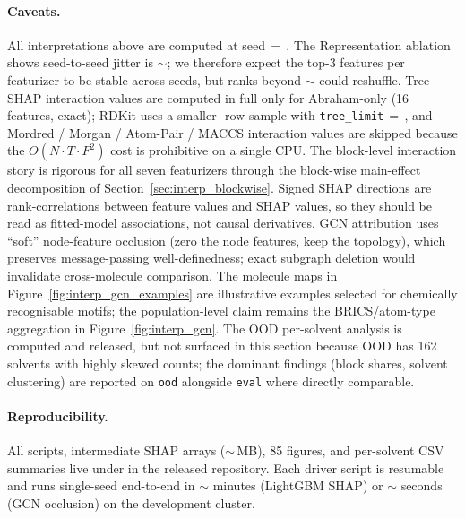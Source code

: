 \paragraph{Caveats.}  All interpretations above are computed at
seed\,$=$\,.  The Representation ablation shows seed-to-seed
\RMSE{} jitter is \(\sim\); we therefore expect the
top-3 features per featurizer to be stable across seeds, but ranks
beyond \(\sim\) could reshuffle.  Tree-SHAP interaction
values are computed in full only for Abraham-only (16 features,
exact); RDKit uses a smaller -row sample with
\texttt{tree\_limit}\,$=$\,, and Mordred / Morgan /
Atom-Pair / MACCS interaction values are skipped because the
$O(N \cdot T \cdot F^2)$ cost is prohibitive on a single CPU.  The
block-level interaction story is rigorous for all seven featurizers
through the block-wise main-effect decomposition of
Section~\ref{sec:interp_blockwise}.  Signed SHAP directions are
rank-correlations between feature values and SHAP values, so they
should be read as fitted-model associations, not causal derivatives.
GCN attribution uses ``soft'' node-feature occlusion (zero the node
features, keep the topology), which preserves message-passing
well-definedness; exact subgraph deletion would invalidate
cross-molecule comparison.  The molecule maps in
Figure~\ref{fig:interp_gcn_examples} are illustrative examples
selected for chemically recognisable motifs; the population-level
claim remains the BRICS/atom-type aggregation in
Figure~\ref{fig:interp_gcn}.  The OOD per-solvent analysis is computed
and released, but not surfaced in this section because OOD has 162
solvents with highly skewed counts; the dominant findings (block
shares, solvent clustering) are reported on \texttt{ood} alongside
\texttt{eval} where directly comparable.

\paragraph{Reproducibility.}  All scripts, intermediate SHAP arrays
($\sim$\,MB), 85 figures, and per-solvent CSV summaries
live under
 in the released repository.
Each driver script is resumable and runs single-seed end-to-end in
\(\sim\) minutes (LightGBM SHAP) or \(\sim\)
seconds (GCN occlusion) on the development cluster.
